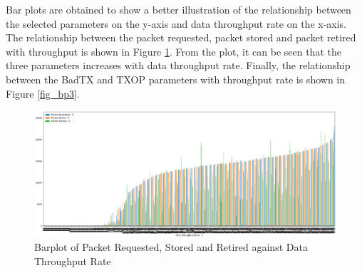 Bar plots are obtained to show a better illustration of the relationship between the selected parameters on the y-axis and data throughput rate on the x-axis. The relationship between the packet requested, packet stored and packet retired with throughput is shown in Figure \ref{fig_bp1}. From the plot, it can be seen that the three parameters increases with data throughput rate.
Finally, the relationship between the BadTX and TXOP parameters with throughput rate is shown in Figure \ref{fig_bp3}.
\begin{figure} [ht]
    \centering
    \includegraphics[scale = 0.52]{pages/Chapter4/Chapter 4 Images/Bplot1.PNG}
    \caption{Barplot of Packet Requested, Stored and Retired against Data Throughput Rate}
    \label{fig_bp1}
\end{figure}

